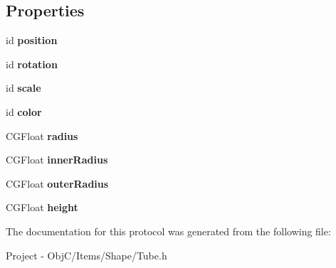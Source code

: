 \subsection*{Properties}
\begin{DoxyCompactItemize}
\item 
\hypertarget{protocol_tube_export-p_ae99197584484ffbd94ec4e50d6f1bde4}{}id {\bfseries position}\label{protocol_tube_export-p_ae99197584484ffbd94ec4e50d6f1bde4}

\item 
\hypertarget{protocol_tube_export-p_a9fdd3124e635a2a9de549a64f1802820}{}id {\bfseries rotation}\label{protocol_tube_export-p_a9fdd3124e635a2a9de549a64f1802820}

\item 
\hypertarget{protocol_tube_export-p_a62adab8731e4ed6929790a8af71d7f3c}{}id {\bfseries scale}\label{protocol_tube_export-p_a62adab8731e4ed6929790a8af71d7f3c}

\item 
\hypertarget{protocol_tube_export-p_a93940a52e0c7e6e7f984e8dbe27eb5b1}{}id {\bfseries color}\label{protocol_tube_export-p_a93940a52e0c7e6e7f984e8dbe27eb5b1}

\item 
\hypertarget{protocol_tube_export-p_aaedeccb3616c9fcb7dcf9818b0836f75}{}C\+G\+Float {\bfseries radius}\label{protocol_tube_export-p_aaedeccb3616c9fcb7dcf9818b0836f75}

\item 
\hypertarget{protocol_tube_export-p_a009af60fbcdd64dc2dfc563f5b506b90}{}C\+G\+Float {\bfseries inner\+Radius}\label{protocol_tube_export-p_a009af60fbcdd64dc2dfc563f5b506b90}

\item 
\hypertarget{protocol_tube_export-p_a2f8209394d51892e8bfaca6b0641cab5}{}C\+G\+Float {\bfseries outer\+Radius}\label{protocol_tube_export-p_a2f8209394d51892e8bfaca6b0641cab5}

\item 
\hypertarget{protocol_tube_export-p_a43e582e61d4fed3f62ffb2f05e196414}{}C\+G\+Float {\bfseries height}\label{protocol_tube_export-p_a43e582e61d4fed3f62ffb2f05e196414}

\end{DoxyCompactItemize}


The documentation for this protocol was generated from the following file\+:\begin{DoxyCompactItemize}
\item 
Project -\/ Obj\+C/\+Items/\+Shape/Tube.\+h\end{DoxyCompactItemize}
